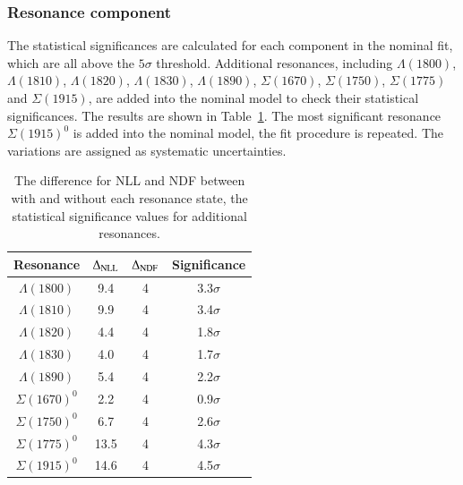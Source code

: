\subsubsection{Resonance component}
\label{sec:syst_component}
The statistical significances are calculated for each component in the nominal fit, which are all above the $5\sigma$ threshold. Additional resonances, including $\Lambda(1800)$, $\Lambda(1810)$, $\Lambda(1820)$, $\Lambda(1830)$, $\Lambda(1890)$, $\Sigma(1670)$, $\Sigma(1750)$, $\Sigma(1775)$ and $\Sigma(1915)$, are added into the nominal model to check their statistical significances. The results are shown in Table~\ref{tab:add_significance}. The most significant resonance $\Sigma(1915)^0$ is added into the nominal model, the fit procedure is repeated. The variations are assigned as systematic uncertainties. 
\begin{table}[h]
    \centering
    \caption{The difference for NLL and NDF between with and without each resonance state, the statistical significance values for additional resonances.}
    \label{tab:add_significance}
    \begin{tabular}{cccc}
        \hline\hline
    Resonance & $\Delta_{\rm NLL}$ & $\Delta_{\rm NDF}$ & Significance \\\hline
    $\Lambda(1800)$ & 9.4 & 4 & 3.3$\sigma$ \\
    $\Lambda(1810)$ & 9.9 & 4 & 3.4$\sigma$ \\
    $\Lambda(1820)$ & 4.4 & 4 & 1.8$\sigma$ \\
    $\Lambda(1830)$ & 4.0 & 4 & 1.7$\sigma$ \\
    $\Lambda(1890)$ & 5.4 & 4 & 2.2$\sigma$ \\
    $\Sigma(1670)^{0}$ & 2.2 & 4 & 0.9$\sigma$ \\
    $\Sigma(1750)^{0}$ & 6.7 & 4 & 2.6$\sigma$ \\
    $\Sigma(1775)^{0}$ & 13.5 & 4 & 4.3$\sigma$ \\
    $\Sigma(1915)^{0}$ & 14.6 & 4 & 4.5$\sigma$ \\
    \hline\hline
    \end{tabular}
\end{table}

